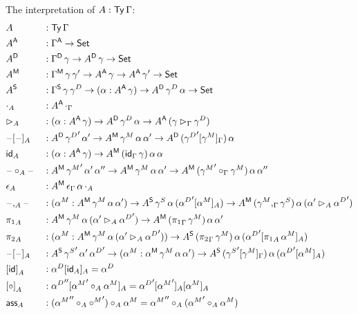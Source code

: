 \documentclass[acmsmall,review,anonymous]{acmart}\settopmatter{printfolios=true,printccs=false,printacmref=false}
\begin{document}
The interpretation of $A:\mathsf{Ty}\,\Gamma$:
{\footnotesize
\begin{alignat*}{5}
  & A && :\Ty\,\Gamma \\
  & A^\A && :\Gamma^\A\ra\Set \\
  & A^\D && :\Gamma^\D\,\gamma\ra A^\D\,\gamma\ra\Set \\
  & A^\M && :\Gamma^\M\,\gamma\,\gamma'\ra A^\A\,\gamma\ra A^\A\,\gamma'\ra\Set \\
  & A^\S && :\Gamma^\S\,\gamma\,\gamma^D\ra (\alpha:A^\A\,\gamma)\ra A^\D\,\gamma^D\,\alpha\ra\Set \\
  & \cdot_A && : A^\A\,\cdot_\Gamma \\
  & \rhd_A && : (\alpha:A^\A\,\gamma)\ra A^\D\,\gamma^D\,\alpha \ra A^\A\,(\gamma\rhd_\Gamma\gamma^D) \\
  & \blank[\blank]_A && : A^\D\,{\gamma^D}'\,\alpha'\ra A^\M\,\gamma^M\,\alpha\,\alpha'\ra A^\D\,({\gamma^D}'[\gamma^M]_\Gamma)\,\alpha \\
  & \id_A && : (\alpha:A^\A\,\gamma)\ra A^\M\,(\id_\Gamma\,\gamma)\,\alpha\,\alpha \\
  & \blank\circ_A\blank && :A^\M\,{\gamma^M}'\,\alpha'\,\alpha''\ra A^\M\,\gamma^M\,\alpha\,\alpha'\ra A^\M\,({\gamma^M}'\circ_\Gamma\gamma^M)\,\alpha\,\alpha'' \\
  & \epsilon_A && : A^\M\,\epsilon_\Gamma\,\alpha\,\cdot_A \\
  & \blank,_A\blank && : (\alpha^M:A^\M\,\gamma^M\,\alpha\,\alpha')\ra A^\S\,\gamma^S\,\alpha\,({\alpha^D}'[\alpha^M]_A)\ra A^\M\,(\gamma^M,_\Gamma\gamma^S)\,\alpha\,(\alpha'\rhd_A{\alpha^D}') \\
  & {\pi_1}_A && : A^\M\,\gamma^M\,\alpha\,(\alpha'\rhd_A{\alpha^D}')\ra A^\M\,({\pi_1}_\Gamma\,\gamma^M)\,\alpha\,\alpha' \\
  & {\pi_2}_A && : (\alpha^M:A^\M\,\gamma^M\,\alpha\,(\alpha'\rhd_A{\alpha^D}'))\ra A^\S\,({\pi_2}_\Gamma\,\gamma^M)\,\alpha\,({\alpha^D}'[{\pi_1}_A\,\alpha^M]_A) \\
  & \blank[\blank]_A && : A^\S\,{\gamma^S}'\,\alpha'\,{\alpha^D}'\ra(\alpha^M:\alpha^\M\,\gamma^M\,\alpha\,\alpha')\ra A^\S\,({\gamma^S}'[\gamma^M]_\Gamma)\,\alpha\,({\alpha^D}'[\alpha^M]_A) \\
  & {[\id]}_A && : \alpha^D[\id_A]_A = \alpha^D \\
  & {[\circ]}_A && : {\alpha^D}''[{\alpha^M}'\circ_A\alpha^M]_A = {\alpha^D}'[{\alpha^M}']_A[\alpha^M]_A \\
  & {\ass}_A && : ({\alpha^M}''\circ_A{\circ^M}')\circ_A\alpha^M = {\alpha^M}''\circ_A({\alpha^M}'\circ_A\alpha^M) \\

\end{alignat*}}
\end{document}
